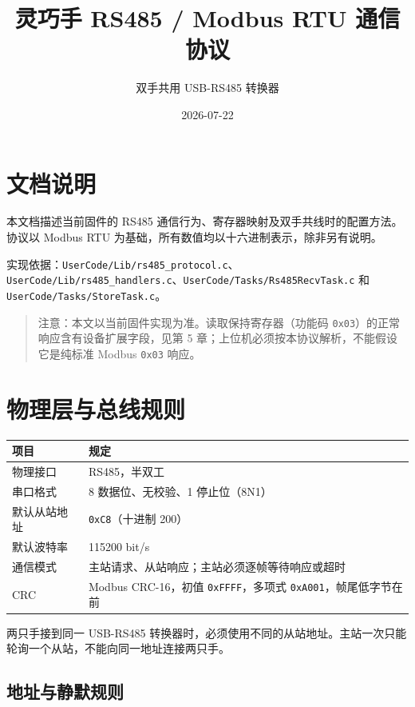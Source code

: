 \documentclass[
  chinese,
]{ctexart}
\title{灵巧手 RS485 / Modbus RTU 通信协议}
\subtitle{双手共用 USB-RS485 转换器}
\author{}
\date{2026-07-22}
\newcounter{none} %
\begin{document}
\maketitle

{
\setcounter{tocdepth}{3}
\tableofcontents
}
\section{文档说明}\label{ux6587ux6863ux8bf4ux660e}

本文档描述当前固件的 RS485
通信行为、寄存器映射及双手共线时的配置方法。协议以 Modbus RTU
为基础，所有数值均以十六进制表示，除非另有说明。

实现依据：\texttt{UserCode/Lib/rs485\_protocol.c}、\texttt{UserCode/Lib/rs485\_handlers.c}、\texttt{UserCode/Tasks/Rs485RecvTask.c}
和 \texttt{UserCode/Tasks/StoreTask.c}。

\begin{quote}
注意：本文以当前固件实现为准。读取保持寄存器（功能码
\texttt{0x03}）的正常响应含有设备扩展字段，见第 5
章；上位机必须按本协议解析，不能假设它是纯标准 Modbus \texttt{0x03}
响应。
\end{quote}

\section{物理层与总线规则}\label{ux7269ux7406ux5c42ux4e0eux603bux7ebfux89c4ux5219}

{\def\LTcaptype{none} %
\begin{longtable}[]{@{}ll@{}}
\toprule\noalign{}
项目 & 规定 \\
\midrule\noalign{}
\endhead
\bottomrule\noalign{}
\endlastfoot
物理接口 & RS485，半双工 \\
串口格式 & 8 数据位、无校验、1 停止位（8N1） \\
默认从站地址 & \texttt{0xC8}（十进制 200） \\
默认波特率 & 115200 bit/s \\
通信模式 & 主站请求、从站响应；主站必须逐帧等待响应或超时 \\
CRC & Modbus CRC-16，初值 \texttt{0xFFFF}，多项式
\texttt{0xA001}，帧尾低字节在前 \\
\end{longtable}
}

两只手接到同一 USB-RS485
转换器时，必须使用不同的从站地址。主站一次只能轮询一个从站，不能向同一地址连接两只手。

\subsection{地址与静默规则}\label{ux5730ux5740ux4e0eux9759ux9ed8ux89c4ux5219}
\end{document}
